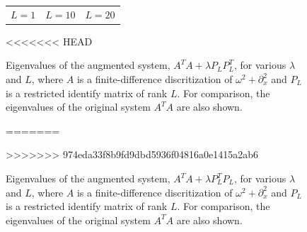 \documentclass{iopart}
\begin{document}
{\begin{figure}
\begin{tabular}{ccc}
{\small $L = 1$}&{\small $L = 10$}&{\small $L = 20$}\\
\end{tabular}
<<<<<<< HEAD
\caption{Eigenvalues of the augmented system,  $A^TA + \lambda P_LP_L^T$, for various $\lambda$ and $L$, where $A$ is a finite-difference discritization of $\omega^2 + \partial_x^2$
and $P_L$ is a restricted identify matrix of rank $L$. For comparison, the eigenvalues of the original system $A^TA$ are also shown.}
=======
\caption{Eigenvalues of the augmented system,  $A^T\!A + \lambda P_L^T\!P_L$, for various $\lambda$ and $L$, where $A$ is a finite-difference discritization of $\omega^2 + \partial_x^2$
and $P_L$ is a restricted identify matrix of rank $L$. For comparison, the eigenvalues of the original system $A^T\!A$ are also shown.}
>>>>>>> 974eda33f8b9fd9dbd5936f04816a0e1415a2ab6
\label{fig:example3}
\end{figure}

}
\end{document}
